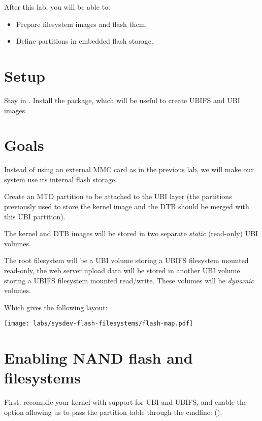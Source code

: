 
After this lab, you will be able to:
\begin{itemize}
\item Prepare filesystem images and flash them.
\item Define partitions in embedded flash storage.
\end{itemize}

\section{Setup}

Stay in . Install the
 package, which will be useful to create UBIFS and
UBI images.

\section{Goals}

Instead of using an external MMC card as in the previous lab, we will
make our system use its internal flash storage.

Create an MTD partition to be attached to the UBI layer (the partitions
previously used to store the kernel image and the DTB should be merged
with this UBI partition).

The kernel and DTB images will be stored in two separate {\em static}
(read-only) UBI volumes.

The root filesystem will be a UBI volume storing a UBIFS filesystem
mounted read-only, the web server upload data will be stored in
another UBI volume storing a UBIFS filesystem mounted
read/write. These volumes will be {\em dynamic} volumes.

Which gives the following layout:

\begin{center}
  \texttt{[image: labs/sysdev-flash-filesystems/flash-map.pdf]}
\end{center}

\section{Enabling NAND flash and filesystems}

First, recompile your kernel with support for UBI and UBIFS, and enable
the option allowing us to pass the partition table through the cmdline:
().

